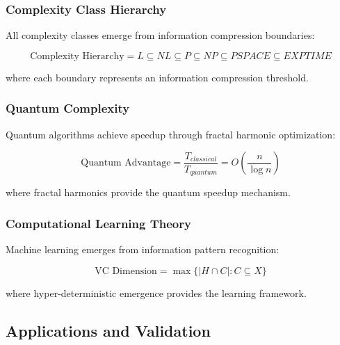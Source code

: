 \subsubsection{Complexity Class Hierarchy}

\begin{theorem}
All complexity classes emerge from information compression boundaries:

\begin{equation}
\text{Complexity Hierarchy} = L \subseteq NL \subseteq P \subseteq NP \subseteq PSPACE \subseteq EXPTIME
\end{equation}

where each boundary represents an information compression threshold.
\end{theorem}

\subsubsection{Quantum Complexity}

\begin{theorem}
Quantum algorithms achieve speedup through fractal harmonic optimization:

\begin{equation}
\text{Quantum Advantage} = \frac{T_{classical}}{T_{quantum}} = O\left( \frac{n}{\log n} \right)
\end{equation}

where fractal harmonics provide the quantum speedup mechanism.
\end{theorem}

\subsubsection{Computational Learning Theory}

\begin{theorem}
Machine learning emerges from information pattern recognition:

\begin{equation}
\text{VC Dimension} = \max \{ |H \cap C| : C \subseteq X \}
\end{equation}

where hyper-deterministic emergence provides the learning framework.
\end{theorem}

\subsection{Applications and Validation}

